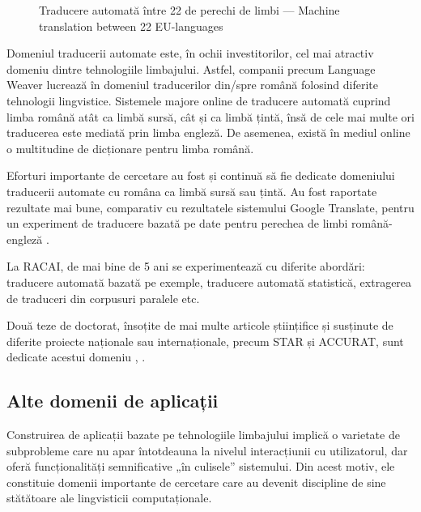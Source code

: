 \begin{multicols}{2}
\begin{figure}[htbp]
\begin{tabular}{>{\columncolor{corange1}}cccccccccccccccccccccccc}
\end{tabular}
\caption{Traducere automată între 22 de perechi de limbi --- \textcolor{grey1}{Machine translation between 22 EU-languages} \cite{euro1}}
\label{fig:euromatrix_ro}
\vspace{-15mm}
\end{figure}

Domeniul traducerii automate este, în ochii investitorilor, cel mai atractiv domeniu dintre tehnologiile limbajului. Astfel, companii precum Language Weaver lucrează în domeniul traducerilor din/spre română folosind diferite tehnologii lingvistice. Sistemele majore online de traducere automată cuprind limba română atât ca limbă sursă, cât și ca limbă țintă, însă de cele mai multe ori traducerea este mediată prin limba engleză. De asemenea, există în mediul online o multitudine de dicționare pentru limba română.\vspace*{-0.09 cm}

Eforturi importante de cercetare au fost și continuă să fie dedicate domeniului traducerii automate cu româna ca limbă sursă sau țintă. Au fost raportate rezultate mai bune, comparativ cu rezultatele sistemului Google Translate, pentru un experiment de traducere bazată pe date pentru perechea de limbi română-engleză \cite{munteanu}. \vspace*{-0.09 cm}

La RACAI, de mai bine de 5 ani se experimentează cu diferite abordări: traducere automată bazată pe exemple, traducere automată statistică, extragerea de traduceri din corpusuri paralele etc. \vspace*{-0.009 cm}

Două teze de doctorat, însoțite de mai multe articole științifice și susținute de diferite proiecte naționale sau internaționale, precum STAR și ACCURAT, sunt dedicate acestui domeniu \cite{tufisMT}, \cite{irimia}. \vspace*{-0.09 cm}

\subsection{Alte domenii de aplicații}\vspace*{-0.009 cm}

Construirea de aplicații bazate pe tehnologiile limbajului implică o varietate de subprobleme care nu apar întotdeauna la nivelul interacțiunii cu utilizatorul, dar oferă funcționalități semnificative „în culisele” sistemului. Din acest motiv, ele constituie domenii importante de cercetare care au devenit discipline de sine stătătoare ale lingvisticii computaționale. 


\end{multicols}
